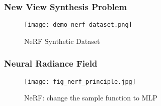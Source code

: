 \begin{frame}
    \frametitle{New View Synthesis Problem}
    \begin{figure}[H]
        \texttt{[image: demo\_nerf\_dataset.png]}
        \caption[short]{NeRF Synthetic Dataset}
    \end{figure}
\end{frame}

\begin{frame}
\frametitle{Neural Radiance Field\cite{mildenhallNeRFRepresentingScenes2020}}
\begin{figure}
    \texttt{[image: fig\_nerf\_principle.jpg]}
    \caption[short]{NeRF: change the sample function to MLP}
\end{figure}
\end{frame}
